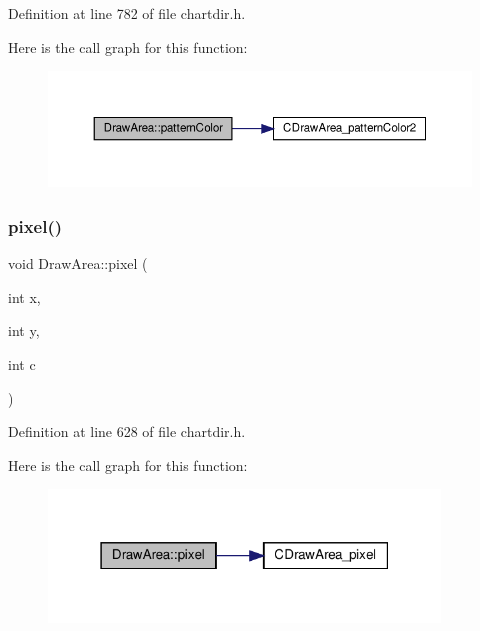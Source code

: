 Definition at line 782 of file chartdir.\+h.

Here is the call graph for this function\+:
\nopagebreak
\begin{figure}[H]
\begin{center}
\leavevmode
\includegraphics[width=350pt]{class_draw_area_a353e36c907dc26831773d2fdf2456745_cgraph}
\end{center}
\end{figure}
\mbox{\label{class_draw_area_ab7428780baec8017a20683a1be03650c}} 
\subsubsection{\texorpdfstring{pixel()}{pixel()}}
{\footnotesize\ttfamily void Draw\+Area\+::pixel (\begin{DoxyParamCaption}\item[{int}]{x,  }\item[{int}]{y,  }\item[{int}]{c }\end{DoxyParamCaption})\hspace{0.3cm}{\ttfamily [inline]}}



Definition at line 628 of file chartdir.\+h.

Here is the call graph for this function\+:
\nopagebreak
\begin{figure}[H]
\begin{center}
\leavevmode
\includegraphics[width=295pt]{class_draw_area_ab7428780baec8017a20683a1be03650c_cgraph}
\end{center}
\end{figure}
\mbox{\label{class_draw_area_a009ef7a0fe6005a3f786b842cc563ef8}} 
